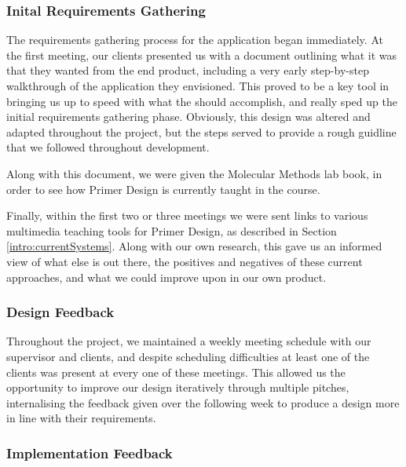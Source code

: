 
\subsubsection{Inital Requirements Gathering}
The requirements gathering process for the application began immediately.
At the first meeting, our clients presented us with a document outlining
what it was that they wanted from the end product, including a very
early step-by-step walkthrough of the application they envisioned. This
proved to be a key tool in bringing us up to speed with what the %
should accomplish, and really sped up the initial requirements gathering
phase. Obviously, this design was altered and adapted throughout the
project, but the steps served to provide a rough guidline that we
followed throughout development.

Along with this document, we were given the Molecular Methods lab book,
in order to see how Primer Design is currently taught in the course.

Finally, within the first two or three meetings we were sent links to
various multimedia teaching tools for Primer Design, as described in
Section \ref{intro:currentSystems}. Along with our own research, this
gave us an informed view of what else is out there, the positives and
negatives of these current approaches, and what we could improve upon
in our own product.
 

\subsubsection{Design Feedback}
Throughout the project, we maintained a weekly meeting schedule with our
supervisor and clients, and despite scheduling difficulties at least one
of the clients was present at every one of these meetings. This allowed
us the opportunity to improve our design iteratively through multiple
pitches, internalising the feedback given over the following week to 
produce a design more in line with their requirements. 

\subsubsection{Implementation Feedback}
